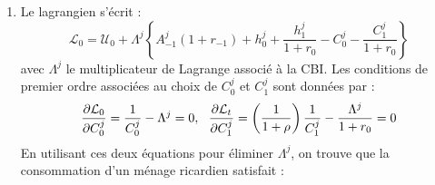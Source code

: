 \documentclass[a4paper,11pt]{article}
\begin{document}
\begin{enumerate}

\item Le lagrangien s'écrit :%
\begin{equation*}
\mathcal{L}_{0}=\mathcal{U}_{0}+\Lambda ^{j}\left\{ A_{-1}^{j}\left(
1+r_{-1}\right) +h_{0}^{j} + \frac{h_{1}^{j}}{1+r_0} - C_{0}^{j} - \frac{C_{1}^{j}}{1+r_0} \right\}
\end{equation*}%
avec $\Lambda ^{j}$ le multiplicateur de Lagrange associé à la CBI.
Les conditions de premier ordre associées au choix de $C_{0}^{j}$ et $%
C_{1}^{j}$ sont données par :%
\begin{equation}
\frac{\partial \mathcal{L}_{0}}{\partial C_{0}^{j}}=\frac{1}{C_{0}^{j}}%
-\Lambda ^{j}=0,\ \ \frac{\partial \mathcal{L}_{t}}{\partial C_{1}^{j}}%
=\left( \frac{1}{1+\rho }\right) \frac{1}{C_{1}^{j}}-\frac{\Lambda ^{j}}{%
1+r_{0}}=0  \label{2 - CPO conso}
\end{equation}%
En utilisant ces deux équations pour éliminer $\Lambda ^{j}$, on
trouve que la consommation d'un ménage ricardien satisfait :%



\end{enumerate}
\end{document}
